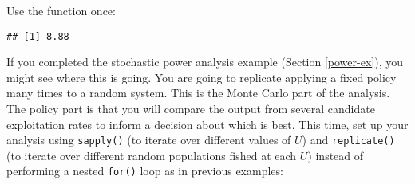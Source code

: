\documentclass[]{book}
\newenvironment{Shaded}{\begin{snugshade}}{\end{snugshade}}
\newcommand{\CommentTok}[1]{\textcolor[rgb]{0.56,0.35,0.01}{\textit{#1}}}
\newcommand{\ControlFlowTok}[1]{\textcolor[rgb]{0.13,0.29,0.53}{\textbf{#1}}}
\newcommand{\DataTypeTok}[1]{\textcolor[rgb]{0.13,0.29,0.53}{#1}}
\newcommand{\DecValTok}[1]{\textcolor[rgb]{0.00,0.00,0.81}{#1}}
\newcommand{\FloatTok}[1]{\textcolor[rgb]{0.00,0.00,0.81}{#1}}
\newcommand{\KeywordTok}[1]{\textcolor[rgb]{0.13,0.29,0.53}{\textbf{#1}}}
\newcommand{\NormalTok}[1]{#1}
\newcommand{\OperatorTok}[1]{\textcolor[rgb]{0.81,0.36,0.00}{\textbf{#1}}}
\newcommand{\StringTok}[1]{\textcolor[rgb]{0.31,0.60,0.02}{#1}}
\begin{document}
Use the function once:

\begin{Shaded}
\end{Shaded}

\begin{verbatim}
## [1] 8.88
\end{verbatim}

If you completed the stochastic power analysis example (Section \ref{power-ex}), you might see where this is going. You are going to replicate applying a fixed policy many times to a random system. This is the Monte Carlo part of the analysis. The policy part is that you will compare the output from several candidate exploitation rates to inform a decision about which is best. This time, set up your analysis using \texttt{sapply()} (to iterate over different values of \(U\)) and \texttt{replicate()} (to iterate over different random populations fished at each \(U\)) instead of performing a nested \texttt{for()} loop as in previous examples:

\begin{Shaded}
\end{Shaded}
\end{document}
